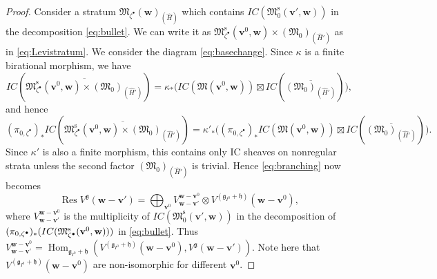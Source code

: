 \documentclass[11pt]{article}
\theoremstyle{definition}
\numberwithin{equation}{section}
\newcommand{\g}{{\mathfrak g}}
\newcommand{\Hom}{\operatorname{Hom}}
\newcommand{\M}{{\mathfrak M}} %
\newcommand{\Mreg}{\M^{\operatorname{s}}}
\newcommand{\bv}{{\mathbf v}} %
\newcommand{\bw}{{\mathbf w}} %
\begin{document}
\begin{proof}
Consider a stratum $\M_{\zeta^\bullet}(\bw)_{(\widehat H)}$ which
contains $IC(\Mreg_0(\bv',\bw))$ in the decomposition
\eqref{eq:bullet}. We can write it as
$\Mreg_{\zeta^\bullet}(\bv^0,\bw)\times (\M_0)_{(\widehat H')}$ as in
\eqref{eq:Levistratum}. We consider the diagram
\eqref{eq:basechange}. Since $\kappa$ is a f\/inite birational morphism,
we have
\begin{equation*}
  IC(\overline{\Mreg_{\zeta^\bullet}(\bv^0,\bw)
     \times (\M_0)_{(\widehat H')}})
   = \kappa_*\big(
     IC(\M(\bv^0,\bw))\boxtimes IC(\overline{(\M_0)_{(\widehat H')}})
   \big),
\end{equation*}
and hence
\begin{equation*}\label{eq:nonregular}
  (\pi_{0,\zeta^\bullet})_* IC(\overline{\Mreg_{\zeta^\bullet}(\bv^0,\bw)
     \times (\M_0)_{(\widehat H')}}) = \kappa'_*\big(
   (\pi_{0,\zeta^\bullet})_*IC(\M(\bv^0,\bw))\boxtimes
   IC(\overline{(\M_0)_{(\widehat H')}})\big).
\end{equation*}
Since $\kappa'$ is also a f\/inite morphism, this contains only IC
sheaves on nonregular strata unless the second factor
$(\M_0)_{(\widehat H')}$ is trivial.
%
Hence \eqref{eq:branching} now becomes
\begin{equation}\label{eq:restriction}
   \operatorname{Res} V^{\g}(\bw - \bv')
   = \bigoplus_{\bv^0} V_{\bw-\bv'}^{\bw-\bv^0}
   \otimes V^{(\g_{I^0}+\mathfrak h)}(\bw - \bv^0),
\end{equation}
where $V_{\bw-\bv'}^{\bw-\bv^0}$ is the multiplicity of
$IC(\Mreg_0(\bv',\bw))$ in the decomposition of\linebreak[2]
$(\pi_{0,\zeta^\bullet})_*\linebreak[2](IC(\Mreg_{\zeta^\bullet}(\bv^0,
\linebreak[2]\bw)))$ in
\eqref{eq:bullet}. Thus
$V_{\bw-\bv'}^{\bw-\bv^0} =
\Hom_{\g_{I^0}+\mathfrak h}
(V^{(\g_{I^0}+\mathfrak h)}(\bw - \bv^0), V^\g(\bw-\bv'))$.
%
Note here that $V^{(\g_{I^0}+\mathfrak h)}(\bw - \bv^0)$ are
non-isomorphic for dif\/ferent $\bv^0$.
\end{proof}
\end{document}
